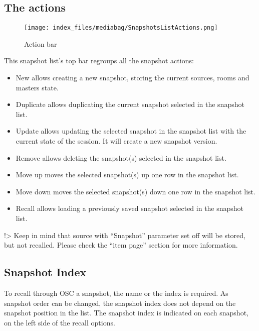 \documentclass[
  letterpaper,
  DIV=11,
  numbers=noendperiod]{scrreport}
\providecommand{\tightlist}{%
  \setlength{\itemsep}{0pt}\setlength{\parskip}{0pt}}\usepackage{longtable,booktabs,array}
\begin{document}
\hypertarget{the-actions}{%
\subsection{The actions}\label{the-actions}}

\begin{figure}

{\centering \texttt{[image: index\_files/mediabag/SnapshotsListActions.png]}

}

\caption{Action bar}

\end{figure}

This snapshot list's top bar regroups all the snapshot actions:

\begin{itemize}
\tightlist
\item
  New allows creating a new snapshot, storing the current sources, rooms
  and masters state.
\item
  Duplicate allows duplicating the current snapshot selected in the
  snapshot list.
\item
  Update allows updating the selected snapshot in the snapshot list with
  the current state of the session. It will create a new snapshot
  version.
\item
  Remove allows deleting the snapshot(s) selected in the snapshot list.
\item
  Move up moves the selected snapshot(s) up one row in the snapshot
  list.
\item
  Move down moves the selected snapshot(s) down one row in the snapshot
  list.
\item
  Recall allows loading a previously saved snapshot selected in the
  snapshot list.
\end{itemize}

!\textgreater{} Keep in mind that source with ``Snapshot'' parameter set
off will be stored, but not recalled. Please check the ``item page''
section for more information.

\hypertarget{snapshot-index}{%
\subsection{Snapshot Index}\label{snapshot-index}}

To recall through OSC a snapshot, the name or the index is required. As
snapshot order can be changed, the snapshot index does not depend on the
snapshot position in the list. The snapshot index is indicated on each
snapshot, on the left side of the recall options.
\end{document}
